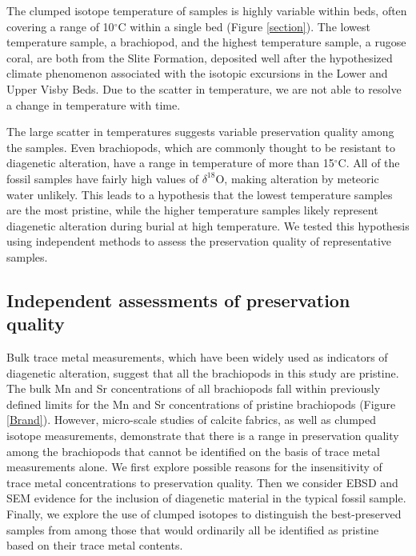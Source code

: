 \documentclass[5p, authoryear]{elsarticle}
\newcommand{\deltao}{$\delta^{18}$}
\newcommand{\degrees}{$^{\circ}$}
\begin{document}
The clumped isotope temperature of samples is highly variable within beds, often covering a range of 10\degrees C within a single bed (Figure \ref{section}). The lowest temperature sample, a brachiopod, and the highest temperature sample, a rugose coral, are both from the Slite Formation, deposited well after the hypothesized climate phenomenon associated with the isotopic excursions in the Lower and Upper Visby Beds. Due to the scatter in temperature, we are not able to resolve a change in temperature with time. 

The large scatter in temperatures suggests variable preservation quality among the samples. Even brachiopods, which are commonly thought to be resistant to diagenetic alteration, have a range in temperature of more than 15\degrees C. All of the fossil samples have fairly high values of \deltao O, making alteration by meteoric water unlikely. This leads to a hypothesis that the lowest temperature samples are the most pristine, while the higher temperature samples likely represent diagenetic alteration during burial at high temperature. We tested this hypothesis using independent methods to assess the preservation quality of representative samples. 

\subsection{Independent assessments of preservation quality}

Bulk trace metal measurements, which have been widely used as indicators of diagenetic alteration, suggest that all the brachiopods in this study are pristine. The bulk Mn and Sr concentrations of all brachiopods fall within previously defined limits for the Mn and Sr concentrations of pristine brachiopods (Figure \ref{Brand}). However, micro-scale studies of calcite fabrics, as well as clumped isotope measurements, demonstrate that there is a range in preservation quality among the brachiopods that cannot be identified on the basis of trace metal measurements alone. We first explore possible reasons for the insensitivity of trace metal concentrations to preservation quality. Then we consider EBSD and SEM evidence for the inclusion of diagenetic material in the typical fossil sample. Finally, we explore the use of clumped isotopes to distinguish the best-preserved samples from among those that would ordinarily all be identified as pristine based on their trace metal contents.  
\end{document}
